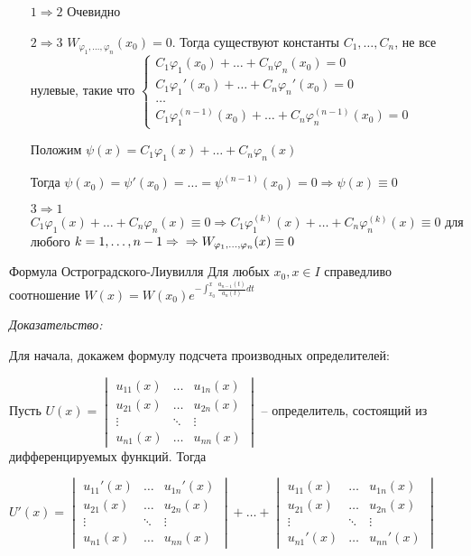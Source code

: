\documentclass[12pt]{article}
\begin{document}
\begin{itemize}
    \item[$1 \Rightarrow 2$] Очевидно
    \item[$2 \Rightarrow 3$] $W_{\varphi_1, \ldots, \varphi_n}(x_0) = 0$. Тогда существуют константы $C_1, \ldots, C_n$, не все нулевые, такие что $\begin{cases}
        C_1\varphi_1(x_0) + \ldots + C_n\varphi_n(x_0) = 0 \\
        C_1\varphi_1'(x_0) + \ldots + C_n\varphi_n'(x_0) = 0 \\
        \ldots \\
        C_1\varphi_1^{(n - 1)}(x_0) + \ldots + C_n\varphi_n^{(n - 1)}(x_0) = 0
    \end{cases}$

    Положим $\psi(x) = C_1\varphi_1(x) + \ldots + C_n\varphi_n(x)$

    Тогда $\psi(x_0) = \psi'(x_0) = \ldots = \psi^{(n - 1)}(x_0) = 0 \Rightarrow \psi(x) \equiv 0$

    \item[$3 \Rightarrow 1$] $C_1\varphi_1(x) + \ldots + C_n\varphi_n(x) \equiv 0 \Rightarrow C_1\varphi_1^{(k)}(x) + \ldots + C_n\varphi_n^{(k)}(x) \equiv 0$ для любого $k = 1, \ldots, n - 1 \Rightarrow \\ \Rightarrow W_{\varphi_1, \ldots, \varphi_n}(x) \equiv 0$
\end{itemize}

\begin{theo}{Формула Остроградского-Лиувилля}
    Для любых $x_0, x \in I$ справедливо соотношение $W(x) = W(x_0) e^{-\int_{x_0}^x \frac{a_{n - 1}(t)}{a_n(t)}dt}$
\end{theo}

\textit{Доказательство:}

Для начала, докажем формулу подсчета производных определителей:

Пусть $U(x) = \begin{vmatrix}
    u_{11}(x) & \ldots & u_{1n}(x) \\
    u_{21}(x) & \ldots & u_{2n}(x) \\
    \vdots & \ddots & \vdots \\
    u_{n1}(x) & \ldots & u_{nn}(x)
\end{vmatrix}$ -- определитель, состоящий из дифференцируемых функций. Тогда 

$U'(x) = \begin{vmatrix}
    u_{11}'(x) & \ldots & u_{1n}'(x) \\
    u_{21}(x) & \ldots & u_{2n}(x) \\
    \vdots & \ddots & \vdots \\
    u_{n1}(x) & \ldots & u_{nn}(x)
\end{vmatrix} + \ldots + \begin{vmatrix}
    u_{11}(x) & \ldots & u_{1n}(x) \\
    u_{21}(x) & \ldots & u_{2n}(x) \\
    \vdots & \ddots & \vdots \\
    u_{n1}'(x) & \ldots & u_{nn}'(x)
\end{vmatrix}$
\end{document}
